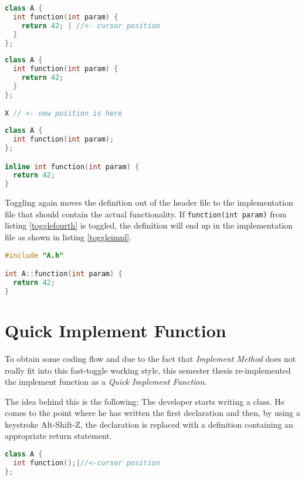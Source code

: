 \begin{lstlisting}[caption={Startposition of toggling},
label={togglefirst}, language=C++]
class A {
  int function(int param) {
    return 42; | //<- cursor position
  }
};
\end{lstlisting}

\begin{lstlisting}[caption={New position is found},
label={togglethird}, language=C++]
class A {
  int function(int param) {
    return 42;
  }
};

X // <- new position is here
\end{lstlisting}

\begin{lstlisting}[caption={Class with declaration and inlined definition},
label={togglefourth}, language=C++]
class A {
  int function(int param);
};

inline int function(int param) {
  return 42;
}
\end{lstlisting}

Toggling again moves the definition out of the header file to the 
implementation file that should contain the actual functionality. If
\texttt{function(int param)} from listing \ref{togglefourth} is toggled,
the definition will end up in the implementation file as shown in listing
\ref{toggleimpl}.

\begin{lstlisting}[caption={Defintion in an implementation file},
label={toggleimpl}, language=C++]
#include "A.h"

int A::function(int param) {
  return 42;
}
\end{lstlisting}

\section*{Quick Implement Function}

To obtain some coding flow and due to the fact that \textit{Implement
Method} does not really fit into this fast-toggle working style, this semester
thesis re-implemented the implement function as a \textit{Quick Implement
Function}.

The idea behind this is the following: The developer starts writing a class.
He comes to the point where he has written the first declaration and then, by
using a keystroke Alt-Shift-Z, the declaration is replaced with a definition
containing an appropriate return statement.

\begin{lstlisting}[caption={Situation before quick implement},
label={beforeimpl}, language=C++]
class A {
  int function();|//<-cursor position
};
\end{lstlisting}

